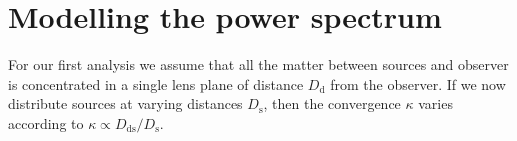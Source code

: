 \documentclass[referee]{aa} %
\renewcommand{\[}{\begin{equation}}
\renewcommand{\]}{\end{equation}}
\renewcommand{\rm}{\mathrm}
\begin{document}

\section{Modelling the power spectrum}
\label{sec:modelling_single_lens}
For our first analysis we assume that all the matter between sources and observer is concentrated in a single lens plane of distance $D_{\rm d}$ from the observer. If we now distribute sources at varying distances $D_{\rm s}$, then the convergence $\kappa$ varies according to $\kappa \propto D_{\rm{ds}}/D_{\rm s}$. 

\end{document}
